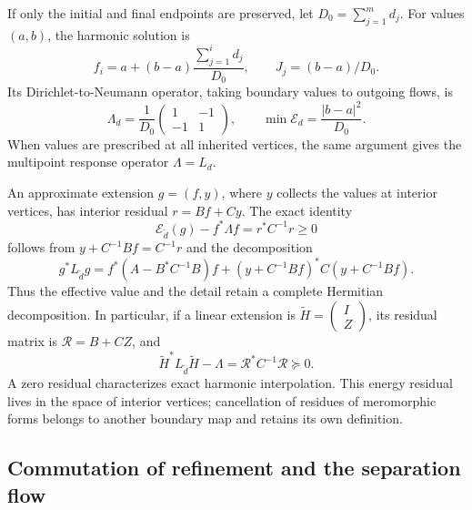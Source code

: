 If only the initial and final endpoints are preserved, let
\(D_0=\sum_{j=1}^md_j\). For values \((a,b)\), the harmonic
solution is
\[
 f_i=a+(b-a)\frac{\sum_{j=1}^id_j}{D_0},\qquad
 J_j=(b-a)/D_0.
\]
Its Dirichlet-to-Neumann operator, taking boundary values to outgoing
flows, is
\begin{equation}
 \Lambda_d=\frac1{D_0}
 \begin{pmatrix}1&-1\\-1&1\end{pmatrix},\qquad
 \min\mathcal E_d=\frac{|b-a|^2}{D_0}.
 \label{eq:dtn-intervalar-k}
\end{equation}
When values are prescribed at all inherited vertices, the same
argument gives the multipoint response operator \(\Lambda=L_d\).

An approximate extension \(g=(f,y)\), where \(y\) collects the
values at interior vertices, has interior residual \(r=Bf+Cy\).
The exact identity
\begin{equation}
 \mathcal E_{\widetilde d}(g)-f^*\Lambda f
 =r^*C^{-1}r\ge0
 \label{eq:residual-dtn-k}
\end{equation}
follows from \(y+C^{-1}Bf=C^{-1}r\) and the decomposition
\[
 g^*L_{\widetilde d}g
 =f^*(A-B^*C^{-1}B)f
 +(y+C^{-1}Bf)^*C(y+C^{-1}Bf).
\]
Thus the effective value and the detail retain a complete Hermitian
decomposition. In particular, if a linear extension is
\(\widetilde H=\begin{pmatrix}I\\Z\end{pmatrix}\), its residual
matrix is \(\mathscr R=B+CZ\), and
\[
 \widetilde H^*L_{\widetilde d}\widetilde H-\Lambda
 =\mathscr R^*C^{-1}\mathscr R\succeq0.
\]
A zero residual characterizes exact harmonic interpolation.
This energy residual lives in the space of interior vertices;
cancellation of residues of meromorphic forms belongs to another
boundary map and retains its own definition.

\subsection{Commutation of refinement and the separation flow}


